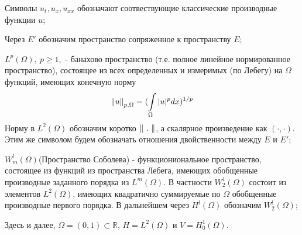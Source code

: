 
\Abbreviations

\begin{description}

    \item{Символы $u_t, u_x, u_{xx}$ обозначают соотвествующие классические
        производные функции $u$;}

    \item{Через $E'$ обозначим пространство сопряженное к пространству $E$;}

    \item{$L^{p}(\Omega), \ p \ge 1,$ - банахово пространство (т.е. полное линейное
нормированное пространство), состоящее из всех определенных и измеримых (по
Лебегу) на $\Omega$ функций, имеющих конечную норму
\begin{equation*}
    \left\lVert u\right\rVert_{p, \Omega} = (\int\limits_{\Omega}{|u|^p dx})^{1/p}
\end{equation*}
Норму в $L^2(\Omega)$ обозначим коротко $\left\lVert\ .\ \right\rVert$, а скалярное произведение
как $(\cdot,\cdot)$. Этим же символом будем обозначать отношения двойственности
между $E$ и $E'$;}

    \item{$W^l_m(\Omega)$(Пространство Соболева) - функциониональное пространство,
состоящее из функций из пространства Лебега, имеющих обобщенные производные 
заданного порядка из $L^m(\Omega)$. В частности
$W^1_2(\Omega)$ состоит из элементов $L^2(\Omega)$, имеющих квадратично
суммируемые по $\Omega$ обобщенные производные первого порядка. В дальнейшем
через $H^l(\Omega)$ обозначим $W^l_2(\Omega)$;}

    \item{Здесь и далее, $\Omega = (0, 1) \subset \mathbb{R}$, $H = L^2(\Omega)$ и 
$V = H^1_0(\Omega)$.}

\end{description}


